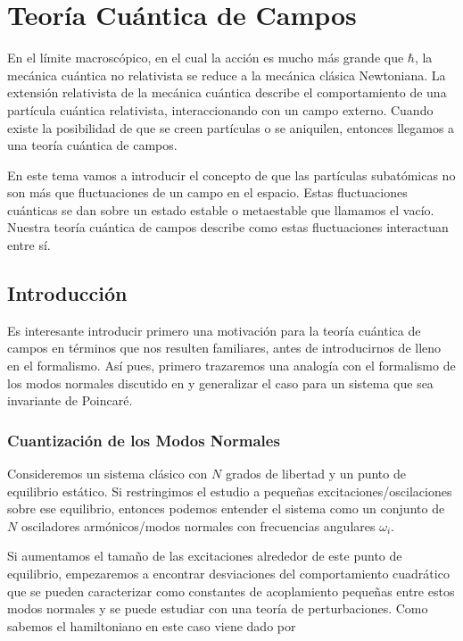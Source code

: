 \chapter{Teoría Cuántica de Campos}

En el límite macroscópico, en el cual la acción es mucho más grande que $\hbar$, la mecánica cuántica no relativista se reduce a la mecánica clásica Newtoniana. La extensión relativista de la mecánica cuántica describe el comportamiento de una partícula cuántica relativista, interaccionando con un campo externo. Cuando existe la posibilidad de que se creen partículas o se aniquilen, entonces llegamos a una teoría cuántica de campos. 

En este tema vamos a introducir el concepto de que las partículas subatómicas no son más que fluctuaciones de un campo en el espacio. Estas fluctuaciones cuánticas se dan sobre un estado estable o metaestable que llamamos el vacío. Nuestra teoría cuántica de campos describe como estas fluctuaciones interactuan entre sí.

\section{Introducción}

Es interesante introducir primero una motivación para la teoría cuántica de campos en términos que nos resulten familiares, antes de introducirnos de lleno en el formalismo. Así pues, primero trazaremos una analogía con el formalismo de los modos normales discutido en y generalizar el caso para un sistema que sea invariante de Poincaré.

\subsection{Cuantización de los Modos Normales}

Consideremos un sistema clásico con $N$ grados de libertad y un punto de equilibrio estático. Si restringimos el estudio a pequeñas excitaciones/oscilaciones sobre ese equilibrio, entonces podemos entender el sistema como un conjunto de $N$ osciladores armónicos/modos normales con frecuencias angulares $\omega_i$.

Si aumentamos el tamaño de las excitaciones alrededor de este punto de equilibrio, empezaremos a encontrar desviaciones del comportamiento cuadrático que se pueden caracterizar como constantes de acoplamiento pequeñas entre estos modos normales y se puede estudiar con una teoría de perturbaciones. Como sabemos el hamiltoniano en este caso viene dado por


